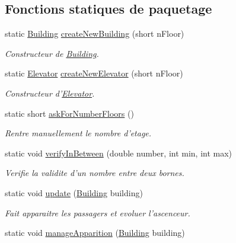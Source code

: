 \subsection*{Fonctions statiques de paquetage}
\begin{DoxyCompactItemize}
\item 
static \hyperlink{classElevatorProject_1_1Building}{Building} \hyperlink{classElevatorProject_a657ce804b44b8e8704b46bfa470c88ba}{create\-New\-Building} (short n\-Floor)
\begin{DoxyCompactList}\small\item\em Constructeur de \hyperlink{classElevatorProject_1_1Building}{Building}. \end{DoxyCompactList}\item 
static \hyperlink{classElevatorProject_1_1Elevator}{Elevator} \hyperlink{classElevatorProject_a6e31a130d7dacb20e2a9fc1748f2d213}{create\-New\-Elevator} (short n\-Floor)
\begin{DoxyCompactList}\small\item\em Constructeur d'\hyperlink{classElevatorProject_1_1Elevator}{Elevator}. \end{DoxyCompactList}\item 
static short \hyperlink{classElevatorProject_a73fd23b9f885bf2ff238ad8d18544d7e}{ask\-For\-Number\-Floors} ()
\begin{DoxyCompactList}\small\item\em Rentre manuellement le nombre d'etage. \end{DoxyCompactList}\item 
static void \hyperlink{classElevatorProject_ae4d75a305a2ccd0070c03452d2fbd518}{verify\-In\-Between} (double number, int min, int max)
\begin{DoxyCompactList}\small\item\em Verifie la validite d'un nombre entre deux bornes. \end{DoxyCompactList}\item 
static void \hyperlink{classElevatorProject_a1bbb614922117d8a18e09f2f40a3515b}{update} (\hyperlink{classElevatorProject_1_1Building}{Building} building)
\begin{DoxyCompactList}\small\item\em Fait apparaitre les passagers et evoluer l'ascenceur. \end{DoxyCompactList}\item 
static void \hyperlink{classElevatorProject_a15b19619f06b6408b657b637d69c9311}{manage\-Apparition} (\hyperlink{classElevatorProject_1_1Building}{Building} building)

\end{DoxyCompactItemize}
